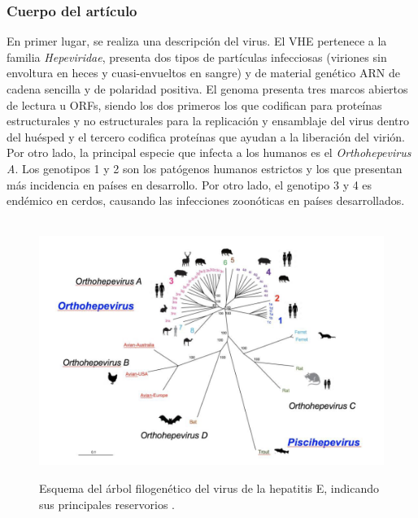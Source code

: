 \documentclass[11 pt]{article}
\begin{document}
\subsubsection{Cuerpo del artículo}
En primer lugar, se realiza una descripción del virus. El VHE pertenece a la familia {\em Hepeviridae}, presenta dos tipos de partículas infecciosas (viriones sin envoltura en heces y cuasi-envueltos en sangre) y de material genético ARN de cadena sencilla y de polaridad positiva. El genoma presenta tres marcos abiertos de lectura u ORFs, siendo los dos primeros los que codifican para proteínas estructurales y no estructurales para la replicación y ensamblaje del virus dentro del huésped y el tercero codifica proteínas que ayudan a la liberación del virión. Por otro lado, la principal especie que infecta a los humanos es el {\em Orthohepevirus A}. Los genotipos 1 y 2 son los patógenos humanos estrictos y los que presentan más incidencia en países en desarrollo. Por otro lado, el genotipo 3 y 4 es endémico en cerdos, causando las infecciones zoonóticas en países desarrollados.\\\\
\begin{figure} [h!] 
	\centering
	\includegraphics[width=0.5\linewidth]{imagenes/arbolfilogenetico.png}
	{\scriptsize \itshape \caption[loftitle]{Esquema del árbol filogenético del virus de la hepatitis E, indicando sus principales reservorios \cite{Larrue2020}.} }
	\label{larrueimagen}
\end{figure}
\end{document}
